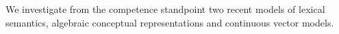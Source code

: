 We investigate from the competence standpoint two recent models of lexical semantics, algebraic conceptual representations and continuous vector models.
